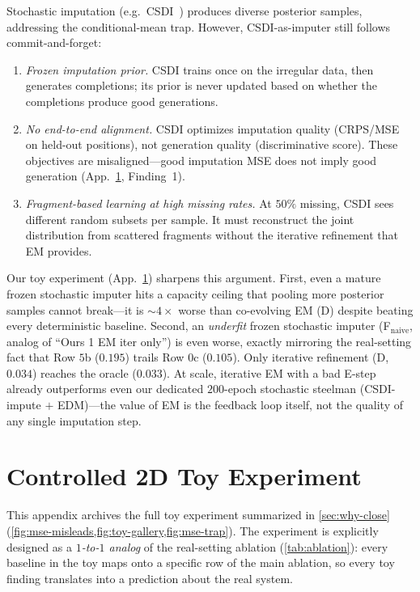 \documentclass{article}
\theoremstyle{plain}
\theoremstyle{definition}
\theoremstyle{remark}
\begin{document}
Stochastic imputation (e.g.\ CSDI~\citep{tashiro2021csdi}) produces diverse posterior samples, addressing the conditional-mean trap. However, CSDI-as-imputer still follows commit-and-forget:
\begin{enumerate}
\setlength{\itemsep}{0pt}
\item \emph{Frozen imputation prior.} CSDI trains once on the irregular data, then generates completions; its prior is never updated based on whether the completions produce good generations.
\item \emph{No end-to-end alignment.} CSDI optimizes imputation quality (CRPS/MSE on held-out positions), not generation quality (discriminative score). These objectives are misaligned---good imputation MSE does not imply good generation (App.~\ref{app:toy}, Finding~1).
\item \emph{Fragment-based learning at high missing rates.} At $50\%$ missing, CSDI sees different random subsets per sample. It must reconstruct the joint distribution from scattered fragments without the iterative refinement that EM provides.
\end{enumerate}
Our toy experiment (App.~\ref{app:toy}) sharpens this argument. First, even a mature frozen stochastic imputer hits a capacity ceiling that pooling more posterior samples cannot break---it is $\sim 4\times$ worse than co-evolving EM (D) despite beating every deterministic baseline. Second, an \emph{underfit} frozen stochastic imputer (F$_{\mathrm{naive}}$, analog of ``Ours 1 EM iter only'') is even worse, exactly mirroring the real-setting fact that Row $5$b ($0.195$) trails Row $0$c ($0.105$). Only iterative refinement (D, $0.034$) reaches the oracle ($0.033$). At scale, iterative EM with a bad E-step already outperforms even our dedicated $200$-epoch stochastic steelman (CSDI-impute $+$ EDM)---the value of EM is the feedback loop itself, not the quality of any single imputation step.

\section{Controlled 2D Toy Experiment}
\label{app:toy}

This appendix archives the full toy experiment summarized in \cref{sec:why-close} (\cref{fig:mse-misleads,fig:toy-gallery,fig:mse-trap}). The experiment is explicitly designed as a \emph{$1$-to-$1$ analog} of the real-setting ablation (\cref{tab:ablation}): every baseline in the toy maps onto a specific row of the main ablation, so every toy finding translates into a prediction about the real system.
\end{document}
